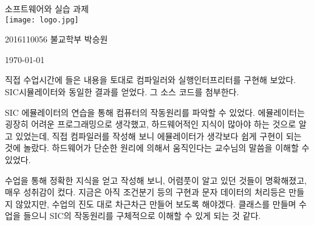 \documentclass[11pt,a4paper,twocolumn,landscape]{article}
\begin{document}
\begin{center}
	 소프트웨어와 실습  과제\\
	\vspace{2cm}
\hfill\texttt{[image: logo.jpg]}

\hfill\Large 2016110056 불교학부 박승원

\hfill\today
\end{center}

\noindent
\lstset{columns=flexible, tabsize=4, frame=single, showstringspaces=false, breaklines=true, upquote=true, basicstyle=\ttfamily\scriptsize}
\begin{enumerate}
\lstset{language=[x86masm]Assembler}


	
		
		
		\lstset{language=C}
직접 수업시간에 들은 내용을 토대로 컴파일러와 실행인터프리터를 구현해 보았다.
SIC시뮬레이터와 동일한 결과를 얻었다.
그 소스 코드를 첨부한다.
	









\end{enumerate}

{}
\indent
SIC 에뮬레이터의 연습을 통해 컴퓨터의 작동원리를 파악할 수 있었다.
에뮬레이터는 굉장히 어려운 프로그래밍으로 생각했고, 하드웨어적인 지식이 많아야 
하는 것으로 알고 있었는데, 
직접 컴파일러를 작성해 보니 에뮬레이터가 생각보다 쉽게 구현이 되는 것에 놀랐다.
하드웨어가 단순한 원리에 의해서 움직인다는 교수님의
말씀을 이해할 수 있었다. 


수업을 통해 정확한 지식을 얻고 작성해 보니, 어렴풋이 
알고 있던 것들이 명확해졌고, 매우 성취감이 컸다. 
지금은 아직 조건분기 등의 구현과 문자 데이터의 처리등은 만들지 않았지만,
수업의 진도 대로 차근차근 만들어 보도록 해야겠다.
클래스를 만들며 수업을 들으니 SIC의 작동원리를 구체적으로 이해할 수 있게 되는 것 같다.
\end{document}
